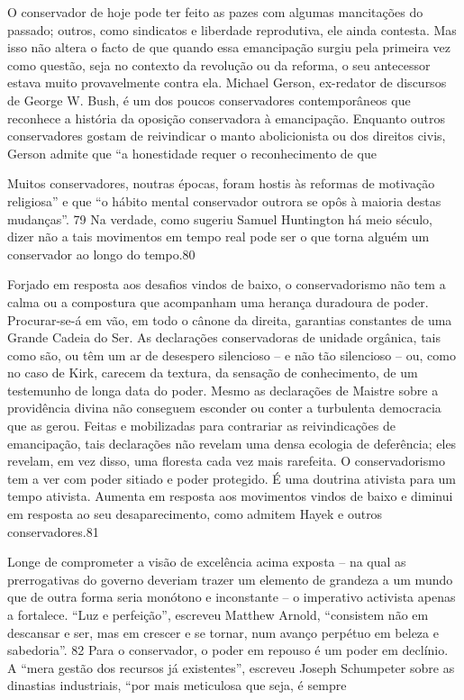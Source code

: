  \par 
O conservador de hoje pode ter feito as pazes com algumas mancitações do passado; outros, como sindicatos e liberdade reprodutiva, ele ainda contesta. Mas isso não altera o facto de que quando essa emancipação surgiu pela primeira vez como questão, seja no contexto da revolução ou da reforma, o seu antecessor estava muito provavelmente contra ela. Michael Gerson, ex-redator de discursos de George W. Bush, é um dos poucos conservadores contemporâneos que reconhece a história da oposição conservadora à emancipação. Enquanto outros conservadores gostam de reivindicar o manto abolicionista ou dos direitos civis, Gerson admite que “a honestidade requer o reconhecimento de que
 \par 
Muitos conservadores, noutras épocas, foram hostis às reformas de motivação religiosa” e que “o hábito mental conservador outrora se opôs à maioria destas mudanças”. {\color{blue}79} Na verdade, como sugeriu Samuel Huntington há meio século, dizer não a tais movimentos em tempo real pode ser o que torna alguém um conservador ao longo do tempo.{\color{blue}80}
 \par 
Forjado em resposta aos desafios vindos de baixo, o conservadorismo não tem a calma ou a compostura que acompanham uma herança duradoura de poder. Procurar-se-á em vão, em todo o cânone da direita, garantias constantes de uma Grande Cadeia do Ser. As declarações conservadoras de unidade orgânica, tais como são, ou têm um ar de desespero silencioso – e não tão silencioso – ou, como no caso de Kirk, carecem da textura, da sensação de conhecimento, de um testemunho de longa data do poder. Mesmo as declarações de Maistre sobre a providência divina não conseguem esconder ou conter a turbulenta democracia que as gerou. Feitas e mobilizadas para contrariar as reivindicações de emancipação, tais declarações não revelam uma densa ecologia de deferência; eles revelam, em vez disso, uma floresta cada vez mais rarefeita. O conservadorismo tem a ver com poder sitiado e poder protegido. É uma doutrina ativista para um tempo ativista. Aumenta em resposta aos movimentos vindos de baixo e diminui em resposta ao seu desaparecimento, como admitem Hayek e outros conservadores.{\color{blue}81}
 \par 
Longe de comprometer a visão de excelência acima exposta – na qual as prerrogativas do governo deveriam trazer um elemento de grandeza a um mundo que de outra forma seria monótono e inconstante – o imperativo activista apenas a fortalece. “Luz e perfeição”, escreveu Matthew Arnold, “consistem não em descansar e ser, mas em crescer e se tornar, num avanço perpétuo em beleza e sabedoria”. {\color{blue}82} Para o conservador, o poder em repouso é um poder em declínio. A “mera gestão dos recursos já existentes”, escreveu Joseph Schumpeter sobre as dinastias industriais, “por mais meticulosa que seja, é sempre
